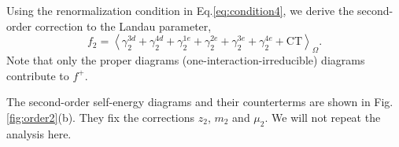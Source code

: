 \documentclass[reprint,amsmath,amssymb,aps,prb]{revtex4-1}
\begin{document}
Using the renormalization condition in Eq.\eqref{eq:condition4}, we derive the second-order correction to the Landau parameter,
\begin{equation}
    f_2 = \left<\gamma_2^{3d}+\gamma_2^{4d}+\gamma_2^{1e}+\gamma_2^{2e}+\gamma_2^{3e}+\gamma_2^{4e} + \text{CT}\right>_\Omega.
\end{equation}
Note that only the proper diagrams (one-interaction-irreducible) diagrams contribute to $f^+$.

The second-order self-energy diagrams and their counterterms are shown in Fig.\ref{fig:order2}(b).
They fix the corrections $z_2$, $m_2$ and $\mu_2$. We will not repeat the analysis here.




\end{document}
